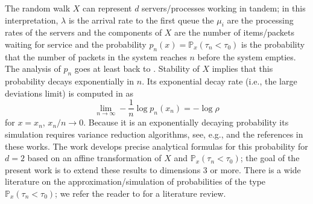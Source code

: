 \documentclass[11pt,a4paper]{article}
\begin{document}
The random walk $X$ can represent $d$ servers/processes working in tandem;
in this interpretation, $\lambda$ is the arrival rate to the first queue
the $\mu_i$ are the processing rates of the servers and the components
of $X$ are the number of items/packets waiting for service and the probability
$p_n(x) = {\mathbb P}_x(\tau_n < \tau_0)$ is the probability that the number
of packets in the system reaches $n$ before the system empties.
The analysis of $p_n$ goes at least back to
\cite{ GlassKou,parekh1989quick}.
Stability of $X$ implies that this probability decays exponentially in $n$.
Its exponential decay rate (i.e., the large deviations limit) is computed in
\cite{GlassKou, ignatiouk2000large} as
\[
\lim_{n\rightarrow \infty} -\frac{1}{n}\log p_n( x_n) =-\log\rho
\]
for $x=x_n$, $x_n/n \rightarrow 0$.
Because it is an exponentially decaying probability
its simulation requires variance reduction algorithms, see, e.g.,
\cite{DSW,blanchet2013optimal} and the references in these works.
The work \cite{sezer2018approximation} develops precise analytical formulas for this probability
for $d=2$ based on an affine transformation of $X$ and 
${\mathbb P}_x(\tau_n < \tau_0)$; the goal of the present work is to extend
these results to dimensions $3$ or more.
There is a wide literature on the approximation/simulation of probabilities of the type 
${\mathbb P}_x(\tau_n < \tau_0)$; we refer the reader to \cite[Sections 1,6]{sezer2018approximation}
for a literature review.
\end{document}
